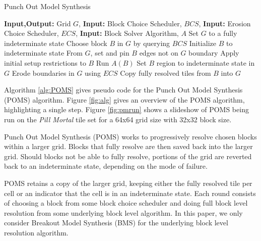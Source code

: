 \begin{algorithm}
  \caption{Punch Out Model Synthesis}
  \label{alg:POMS}
  \begin{algorithmic}
    \State \textbf{Input,Output:} Grid $G$,
    \State \textbf{Input:} Block Choice Scheduler, $BCS$,
    \State \textbf{Input:} Erosion Choice Scheduler, $ECS$,
    \State \textbf{Input:} Block Solver Algorithm, $A$
    \State Set $G$ to a fully indeterminate state
      \State Choose block $B$ in $G$ by querying $BCS$
      \State Initialize $B$ to indeterminate state
      \State From $G$, set and pin $B$ edges not on $G$ boundary
      \State Apply initial setup restrictions to $B$
      \State Run $A(B)$ 
        \State Set $B$ region to indeterminate state in $G$
        \State Erode boundaries in $G$ using $ECS$
      \Else
        \State Copy fully resolved tiles from $B$ into $G$ 
      \EndIf

    \EndWhile

  \end{algorithmic}
\end{algorithm}

Algorithm \ref{alg:POMS} gives pseudo code for the Punch Out Model Synthesis (POMS) algorithm.
Figure \ref{fig:alg} gives an overview of the POMS algorithm, highlighting
a single step. Figure \ref{fig:pmrun} shows a slideshow of POMS being run on the \textit{Pill Mortal}
tile set for a 64x64 grid size with 32x32 block size.

Punch Out Model Synthesis (POMS) works to progressively resolve chosen
blocks within a larger grid.
Blocks that fully resolve are then saved back into the larger grid.
Should blocks not be able to fully resolve, portions of the grid
are reverted back to an indeterminate state, depending on the mode of failure.


POMS retains a copy of the larger grid, keeping either the fully resolved
tile per cell or an indicator that the cell is in an indeterminate state.
Each round consists of choosing a block from some block choice scheduler 
and doing full block level resolution from some underlying block level algorithm.
In this paper, we only consider Breakout Model Synthesis (BMS) \cite{Hoetzlein_2023}
for the underlying block level resolution algorithm.


